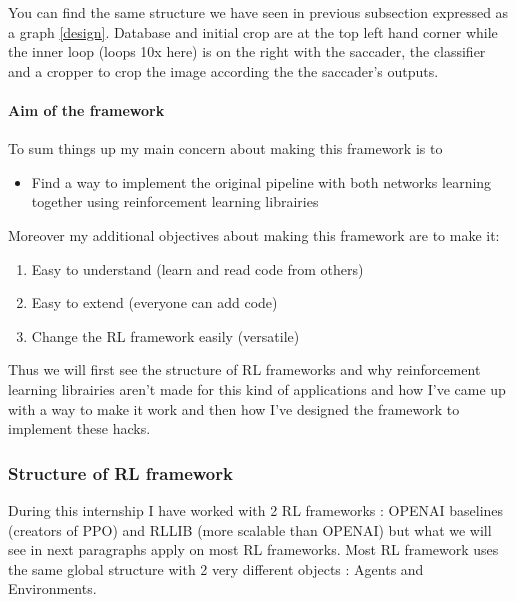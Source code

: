 \documentclass[11pt]{article}
\begin{document}
 You can find the same structure we have seen in previous subsection expressed as a graph \ref{design}. Database and initial crop are at the top left hand corner while the inner loop (loops 10x here) is on the right with the saccader, the classifier and a cropper to crop the image according the the saccader's outputs.

\paragraph{Aim of the framework}
To sum things up my main concern about making this framework is to
\begin{itemize}
\item Find a way to implement the original pipeline with both networks learning together using reinforcement learning librairies
\end{itemize}
Moreover my additional objectives about making this framework are to make it:
\begin{enumerate}
\item Easy to understand (learn and read code from others)
\item Easy to extend (everyone can add code)
\item Change the RL framework easily (versatile)
\end{enumerate}
Thus we will first see the structure of RL frameworks and why reinforcement learning librairies aren't made for this kind of applications and how I've came up with a way to make it work and then how I've designed the framework to implement these hacks.



\subsubsection{Structure of RL framework}
During this internship I have worked with 2 RL frameworks : OPENAI baselines (creators of PPO) and RLLIB (more scalable than OPENAI) but what we will see in next paragraphs apply on most RL frameworks.
Most RL framework uses the same global structure with 2 very different objects : Agents and Environments.
\end{document}
